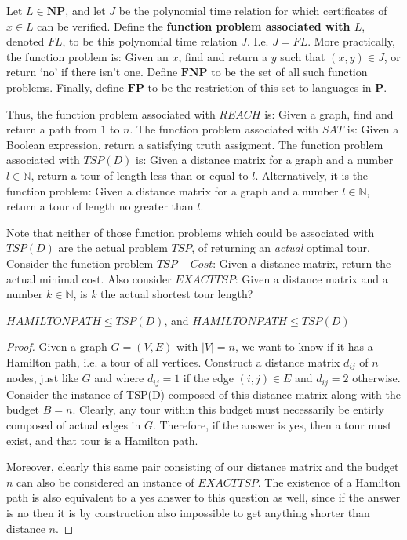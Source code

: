 \begin{definition}
    Let $L \in \mathbf{NP}$, and let $J$ be the polynomial time relation for which certificates of $x \in L$ can be verified. Define the \textbf{function problem associated with $L$}, denoted $FL$, to be this polynomial time relation $J$. I.e. $J = FL$. More practically, the function problem is: Given an $x$, find and return a $y$ such that $(x,y) \in J$, or return `no' if there isn't one. Define $\mathbf{FNP}$ to be the set of all such function problems. Finally, define $\mathbf{FP}$ to be the restriction of this set to languages in $\mathbf{P}$.
\end{definition}

Thus, the function problem associated with $REACH$ is: Given a graph, find and return a path from $1$ to $n$. The function problem associated with $SAT$ is: Given a Boolean expression, return a satisfying truth assigment. The function problem associated with $TSP(D)$ is: Given a distance matrix for a graph and a number $l \in \mathbb{N}$, return a tour of length less than or equal to $l$. Alternatively, it is the function problem: Given a distance matrix for a graph and a number $l \in \mathbb{N}$, return a tour of length no greater than $l$.

Note that neither of those function problems which could be associated with $TSP(D)$ are the actual problem $TSP$, of returning an \emph{actual} optimal tour. Consider the function problem $TSP-Cost$: Given a distance matrix, return the actual minimal cost. Also consider $EXACT TSP$: Given a distance matrix and a number $k \in \mathbb{N}$, is $k$ the actual shortest tour length? 

\begin{lemma}\label{convenient}
    $HAMILTON PATH \leq TSP(D)$, and $HAMILTON PATH \leq TSP(D)$
\end{lemma}

\begin{proof}
    Given a graph $G = (V,E)$ with $|V| = n$, we want to know if it has a Hamilton path, i.e. a tour of all vertices. Construct a distance matrix $d_{ij}$ of $n$ nodes, just like $G$ and where $d_{ij} = 1$ if the edge $(i,j) \in E$ and $d_{ij} = 2$ otherwise. Consider the instance of TSP(D) composed of this distance matrix along with the budget $B = n$. Clearly, any tour within this budget must necessarily be entirly composed of actual edges in $G$. Therefore, if the answer is yes, then a tour must exist, and that tour is a Hamilton path. 

    Moreover, clearly this same pair consisting of our distance matrix and the budget $n$ can also be considered an instance of $EXACT TSP$. The existence of a Hamilton path is also equivalent to a yes answer to this question as well, since if the answer is no then it is by construction also impossible to get anything shorter than distance $n$. 
\end{proof}

